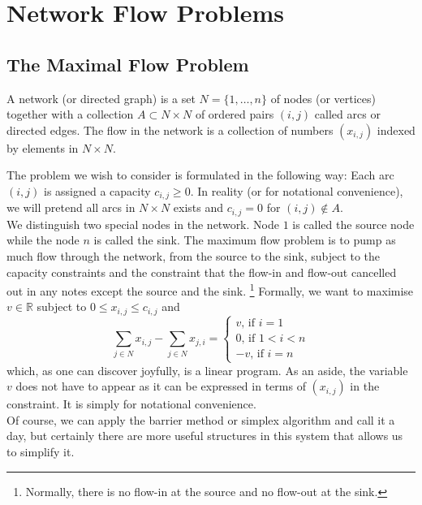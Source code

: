 \section{Network Flow Problems}
\subsection{The Maximal Flow Problem}
\begin{definition}
    A network (or directed graph) is a set $N=\{1,\ldots,n\}$ of nodes (or vertices) together with a collection $A\subset N\times N$ of ordered pairs $(i,j)$ called arcs or directed edges.
    The flow in the network is a collection of numbers $(x_{i,j})$ indexed by elements in $N\times N$.
\end{definition}
The problem we wish to consider is formulated in the following way:
Each arc $(i,j)$ is assigned a capacity $c_{i,j}\ge 0$.
In reality (or for notational convenience), we will pretend all arcs in $N\times N$ exists and $c_{i,j}=0$ for $(i,j)\notin A$.\\
We distinguish two special nodes in the network.
Node $1$ is called the source node while the node $n$ is called the sink.
The maximum flow problem is to pump as much flow through the network, from the source to the sink, subject to the capacity constraints and the constraint that the flow-in and flow-out cancelled out in any notes except the source and the sink.
\footnote{Normally, there is no flow-in at the source and no flow-out at the sink.}
Formally, we want to maximise $v\in\mathbb R$ subject to $0\le x_{i,j}\le c_{i,j}$ and
$$\sum_{j\in N}x_{i,j}-\sum_{j\in N}x_{j,i}=\begin{cases}
    v\text{, if $i=1$}\\
    0\text{, if $1<i<n$}\\
    -v\text{, if $i=n$}
\end{cases}$$
which, as one can discover joyfully, is a linear program.
As an aside, the variable $v$ does not have to appear as it can be expressed in terms of $(x_{i,j})$ in the constraint.
It is simply for notational convenience.\\
Of course, we can apply the barrier method or simplex algorithm and call it a day, but certainly there are more useful structures in this system that allows us to simplify it.
